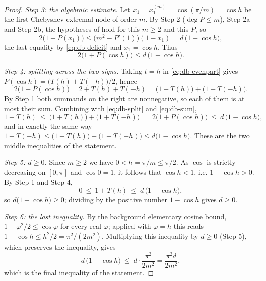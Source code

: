 \begin{proof}
\emph{Step 3: the algebraic estimate.} Let $x_1=x^{(m)}_1=\cos(\pi/m)=\cos h$ be
the first Chebyshev extremal node of order $m$. By Step 2 ($\deg P\le m$), Step
2a and Step 2b, the hypotheses of  hold for this $m\ge2$ and
this $P$, so
\[
  2\bigl(1+P(x_1)\bigr)\le\bigl(m^2-P'(1)\bigr)(1-x_1)
  =d\,\bigl(1-\cos h\bigr),
\]
the last equality by \eqref{eq:db-deficit} and $x_1=\cos h$. Thus
\begin{equation}\label{eq:db-sum}
  2\bigl(1+P(\cos h)\bigr)\le d\,\bigl(1-\cos h\bigr).
\end{equation}

\emph{Step 4: splitting across the two signs.} Taking $t=h$ in
\eqref{eq:db-evenpart} gives $P(\cos h)=\bigl(T(h)+T(-h)\bigr)/2$, hence
\begin{equation}\label{eq:db-split}
  2\bigl(1+P(\cos h)\bigr)=2+T(h)+T(-h)
  =\bigl(1+T(h)\bigr)+\bigl(1+T(-h)\bigr).
\end{equation}
By Step 1 both summands on the right are nonnegative, so each of them is at most
their sum. Combining with \eqref{eq:db-split} and \eqref{eq:db-sum},
\[
  1+T(h)\ \le\ \bigl(1+T(h)\bigr)+\bigl(1+T(-h)\bigr)
  \ =\ 2\bigl(1+P(\cos h)\bigr)\ \le\ d\,\bigl(1-\cos h\bigr),
\]
and in exactly the same way
$1+T(-h)\le\bigl(1+T(h)\bigr)+\bigl(1+T(-h)\bigr)\le d\bigl(1-\cos h\bigr)$.
These are the two middle inequalities of the statement.

\emph{Step 5: $d\ge0$.} Since $m\ge2$ we have $0<h=\pi/m\le\pi/2$. As $\cos$ is
strictly decreasing on $[0,\pi]$ and $\cos0=1$, it follows that $\cos h<1$, i.e.
$1-\cos h>0$. By Step 1 and Step 4,
\[
  0\ \le\ 1+T(h)\ \le\ d\,\bigl(1-\cos h\bigr),
\]
so $d\bigl(1-\cos h\bigr)\ge0$; dividing by the positive number $1-\cos h$ gives
$d\ge0$.

\emph{Step 6: the last inequality.} By the background elementary cosine bound,
$1-\varphi^2/2\le\cos\varphi$ for every real $\varphi$; applied with
$\varphi=h$ this reads $1-\cos h\le h^2/2=\pi^2/(2m^2)$. Multiplying this
inequality by $d\ge0$ (Step 5), which preserves the inequality, gives
\[
  d\,\bigl(1-\cos h\bigr)\ \le\ d\cdot\frac{\pi^2}{2m^2}
  =\frac{\pi^2d}{2m^2},
\]
which is the final inequality of the statement.
\end{proof}
